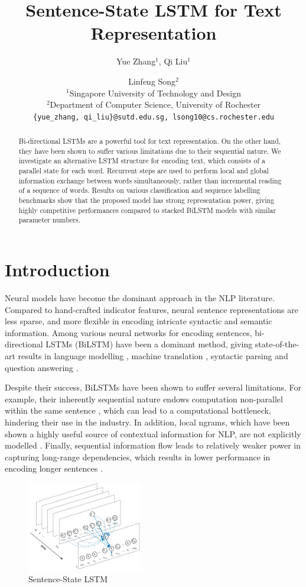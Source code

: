 \documentclass[11pt,a4paper]{article}
\title{Sentence-State LSTM for Text Representation}
\author{Yue Zhang$^1$, Qi Liu$^1$ \and Linfeng Song$^2$ \\
  $^1$Singapore University of Technology and Design \\
  $^2$Department of Computer Science, University of Rochester \\
  {\tt \{yue\_zhang, qi\_liu\}@sutd.edu.sg, lsong10@cs.rochester.edu} \\ }
\date{}
\begin{document}
\maketitle
\begin{abstract}
Bi-directional LSTMs are a powerful tool for text representation. 
On the other hand, they have been shown to suffer various limitations due to their sequential nature. 
We investigate an alternative LSTM structure for encoding text, which consists of a parallel state for each word. Recurrent steps are used to perform local and global information exchange between words simultaneously, rather than incremental reading of a sequence of words. 
Results on various classification and sequence labelling benchmarks show that the proposed model has strong representation power, giving highly competitive performances compared to stacked BiLSTM models with similar parameter numbers.
\end{abstract}


\section{Introduction}
Neural models have become the dominant approach in the NLP literature.
Compared to hand-crafted indicator features, neural sentence representations are less sparse, and more flexible in encoding intricate syntactic and semantic information. 
Among various neural networks for encoding sentences, bi-directional LSTMs (BiLSTM) \cite{hochreiter1997long} have been a dominant method, giving state-of-the-art results in language modelling \cite{sundermeyer2012lstm}, machine translation \cite{bahdanau2014neural}, syntactic parsing \cite{dozat2016deep} and question answering \cite{tan2015lstm}. 


Despite their success, BiLSTMs have been shown to suffer several limitations. 
For example, their inherently sequential nature endows computation non-parallel within the same sentence \cite{vaswani2017attention}, which can lead to a computational bottleneck, hindering their use in the industry.
In addition, local ngrams, which have been shown a highly useful source of contextual information for NLP, are not explicitly modelled  \cite{wang2016combination}. 
Finally, sequential information flow leads to relatively weaker power in capturing long-range dependencies, which results in lower performance in encoding longer sentences \cite{koehn2017six}.

\begin{figure}[t]
\centering	
\includegraphics[width=0.45\textwidth]{slstm_fig.pdf}
\caption{Sentence-State LSTM}
\label{fig:mlstm}
\end{figure}
\end{document}
